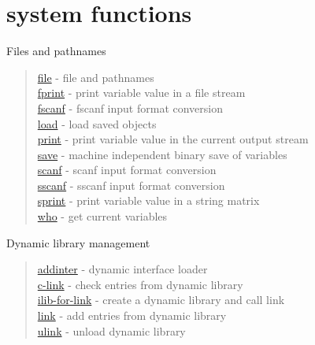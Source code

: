 \chapter*{system functions}

Files and pathnames
\begin{quote}
\noindent
\hyperlink{file}{file} - file and pathnames\\
\hyperlink{fprint}{fprint} - print variable value in a file stream\\
\hyperlink{fscanf}{fscanf} - fscanf input format conversion \\
\hyperlink{load}{load} - load saved objects\\
\hyperlink{print}{print} - print variable value  in the current output stream\\
\hyperlink{save}{save} - machine independent binary save of variables\\
\hyperlink{scanf}{scanf} - scanf input format conversion \\
\hyperlink{sscanf}{sscanf} - sscanf input format conversion \\
\hyperlink{sprint}{sprint} - print variable value in a string matrix \\
\hyperlink{who}{who} - get current variables\\
\end{quote}

Dynamic library management
\begin{quote}
\noindent 
\hyperlink{addinter}{addinter} - dynamic interface loader\\
\hyperlink{c_link}{c-link} - check entries from dynamic library \\
\hyperlink{ilib_for_link}{ilib-for-link} - create a dynamic library and call link \\
\hyperlink{link}{link} - add entries from dynamic library \\
\hyperlink{ulink}{ulink} - unload dynamic library \\
\end{quote}



  
  

 
 
 
 
 
